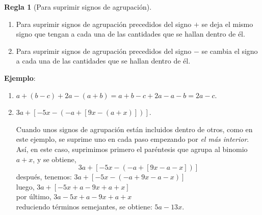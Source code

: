 \documentclass[12pt,letterpaper]{article}
\theoremstyle{definition}
\newtheorem{reg}{Regla}
\begin{document}
\begin{reg}[Para suprimir signos de agrupación] \ 
\begin{enumerate}
\item Para suprimir signos de agrupación precedidos del signo $+$ se deja el mismo signo que tengan a cada una de las cantidades que se hallan dentro de él.
\item Para suprimir signos de agrupación precedidos del signo $-$ se cambia el signo a cada una de las cantidades que se hallan dentro de él.
\end{enumerate}
\end{reg}

\textbf{Ejemplo}:
\begin{enumerate}
\item $a+(b-c)+2a-(a+b)=a+b-c+2a-a-b=2a-c$.
\item $3a+\left\lbrack-5x-\left(-a+\left\lbrack9x-\left(a+x\right)\right\rbrack\right)\right\rbrack$. \ 

Cuando unos signos de agrupación están incluidos dentro de otros, como en este ejemplo, se suprime uno en cada paso empezando por \emph{el más interior}. Así, en este caso, suprimimos primero el paréntesis que agrupa al binomio $a+x$, y se obtiene,
\begin{equation*}
3a+\left\lbrack-5x-\left(-a+\left\lbrack9x-a-x\right\rbrack\right)\right\rbrack
\end{equation*}
después, tenemos: $3a+\left\lbrack-5x-\left(-a+9x-a-x\right)\right\rbrack$\\
luego, $3a+\left\lbrack-5x+a-9x+a+x\right\rbrack$\\
por último, $3a-5x+a-9x+a+x$\\
reduciendo términos semejantes, se obtiene:  $5a-13x$.
\end{enumerate}

\pagebreak
\end{document}
